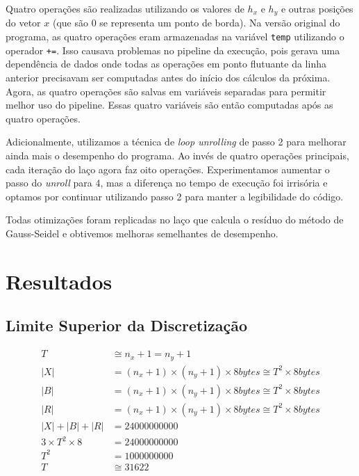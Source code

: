 \documentclass[12pt]{article}
\begin{document}
	Quatro operações são realizadas utilizando os valores de $h_x$ e $h_y$ e outras posições do vetor $x$ (que são $0$ se representa um ponto de borda).
	Na versão original do programa, as quatro operações eram armazenadas na variável \texttt{temp} utilizando o operador \texttt{+=}.
	Isso causava problemas no pipeline da execução, pois gerava uma dependência de dados onde todas as operações em ponto flutuante da linha anterior precisavam ser computadas antes do início dos cálculos da próxima.
	Agora, as quatro operações são salvas em variáveis separadas para permitir melhor uso do pipeline. 
	Essas quatro variáveis são então computadas após as quatro operações.
	
	Adicionalmente, utilizamos a técnica de \emph{loop unrolling} de passo 2 para melhorar ainda mais o desempenho do programa.
	Ao invés de quatro operações principais, cada iteração do laço agora faz oito operações.
	Experimentamos aumentar o passo do \emph{unroll} para 4, mas a diferença no tempo de execução foi irrisória e optamos por continuar utilizando passo 2 para manter a legibilidade do código.
	
	Todas otimizações foram replicadas no laço que calcula o resíduo do método de Gauss-Seidel e obtivemos melhoras semelhantes de desempenho.

\newpage

\section{Resultados}

	\subsection{Limite Superior da Discretização}

	\begin{align*}
		T &\cong n_x + 1 = n_y + 1 \\
		|X| &= (n_x+1)\times(n_y+1)\times8 bytes \cong T^2\times8 bytes \\
		|B| &= (n_x+1)\times(n_y+1)\times8 bytes \cong T^2\times8 bytes \\
		|R| &= (n_x+1)\times(n_y+1)\times8 bytes \cong T^2\times8 bytes \\
		|X| + |B| + |R| &= 24000000000 \\
		3\times T^2\times8 &= 24000000000 \\
		T^2 &= 1000000000\\
		T &\cong 31622
	\end{align*}
\end{document}
